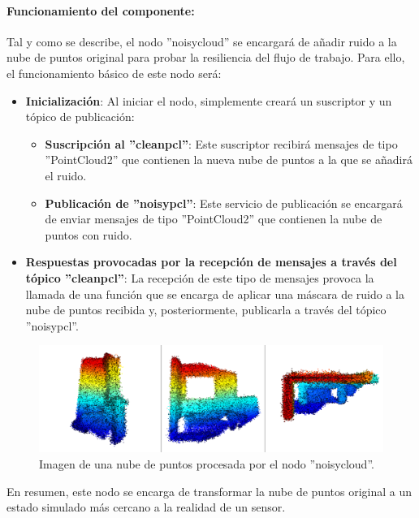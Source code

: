 \documentclass[12pt, a4paper, twoside]{article}
\begin{document}
\paragraph{Funcionamiento del componente:} 
Tal y como se describe, el nodo ''noisy\textunderscore cloud'' se encargará de añadir ruido a la nube de puntos original para probar la resiliencia 
del flujo de trabajo. Para ello, el funcionamiento básico de este nodo será:
\begin{itemize}
  \item \textbf{Inicialización}: Al iniciar el nodo, simplemente creará un suscriptor y un tópico de publicación:
  \begin{itemize}
    \item \textbf{Suscripción al ''clean\textunderscore pcl''}: Este suscriptor recibirá mensajes de tipo ''PointCloud2'' que contienen la nueva nube de puntos
    a la que se añadirá el ruido.
    \item \textbf{Publicación de ''noisy\textunderscore pcl''}: Este servicio de publicación se encargará de enviar mensajes de tipo ''PointCloud2'' que 
    contienen la nube de puntos con ruido. 
  \end{itemize}
  \item \textbf{Respuestas provocadas por la recepción de mensajes a través del tópico ''clean\textunderscore pcl''}: La recepción de este tipo de mensajes 
  provoca la llamada de una función que se encarga de aplicar una máscara de ruido a la nube de puntos recibida y, posteriormente, publicarla a través del 
  tópico ''noisy\textunderscore pcl''.
\end{itemize}
\begin{figure}[h]
  \centering
    \includegraphics[width=1\textwidth]{noisy_pcl.png}
  \caption{Imagen de una nube de puntos procesada por el nodo ''noisy\textunderscore cloud''.}
\end{figure}
En resumen, este nodo se encarga de transformar la nube de puntos original a un estado simulado más cercano a la realidad de un sensor.
\end{document}
